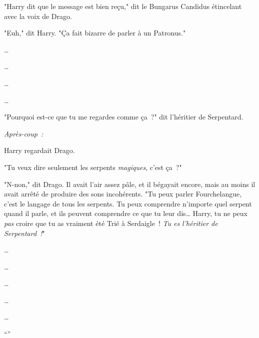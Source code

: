 "Harry dit que le message est bien reçu," dit le Bungarus Candidus étincelant avec la voix de Drago.

"Euh," dit Harry. "Ça fait bizarre de parler à un Patronus."

…

…

…

…

"Pourquoi est-ce que tu me regardes comme ça~?" dit l'héritier de Serpentard.

\later

\emph{Après-coup~:}

Harry regardait Drago.

"Tu veux dire seulement les serpents \emph{magiques}, c'est ça~?"

"N-non," dit Drago. Il avait l'air assez pâle, et il bégayait encore, mais au moins il avait arrêté de produire des sons incohérents. "Tu peux parler Fourchelangue, c'est le langage de tous les serpents. Tu peux comprendre n'importe quel serpent quand il parle, et ils peuvent comprendre ce que tu leur dis… Harry, tu ne peux \emph{pas} croire que tu as vraiment été Trié à Serdaigle~! \emph{Tu es l'héritier de Serpentard~!}"

…

…

…

…

…

“” 

